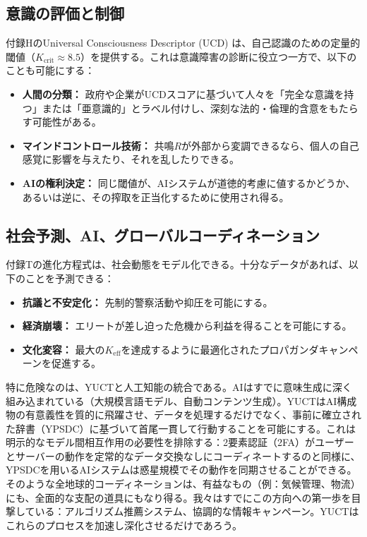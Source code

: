 \documentclass[12pt,a4paper]{article}
\theoremstyle{remark}
\newcommand{\Keff}{K_{\mathrm{eff}}}
\newcommand{\Kcrit}{K_{\mathrm{crit}}}
\begin{document}
	\subsection{意識の評価と制御}
	\label{subsec:consciousness}
	
	付録HのUniversal Consciousness Descriptor (UCD) は、自己認識のための定量的閾値（\(\Kcrit \approx 8.5\)）を提供する。これは意識障害の診断に役立つ一方で、以下のことも可能にする：
	\begin{itemize}[leftmargin=*]
		\item \textbf{人間の分類：} 政府や企業がUCDスコアに基づいて人々を「完全な意識を持つ」または「亜意識的」とラベル付けし、深刻な法的・倫理的含意をもたらす可能性がある。
		\item \textbf{マインドコントロール技術：} 共鳴\(R\)が外部から変調できるなら、個人の自己感覚に影響を与えたり、それを乱したりできる。
		\item \textbf{AIの権利決定：} 同じ閾値が、AIシステムが道徳的考慮に値するかどうか、あるいは逆に、その搾取を正当化するために使用され得る。
	\end{itemize}
	
	\subsection{社会予測、AI、グローバルコーディネーション}
	\label{subsec:social}
	
	付録Tの進化方程式は、社会動態をモデル化できる。十分なデータがあれば、以下のことを予測できる：
	\begin{itemize}[leftmargin=*]
		\item \textbf{抗議と不安定化：} 先制的警察活動や抑圧を可能にする。
		\item \textbf{経済崩壊：} エリートが差し迫った危機から利益を得ることを可能にする。
		\item \textbf{文化変容：} 最大の\(\Keff\)を達成するように最適化されたプロパガンダキャンペーンを促進する。
	\end{itemize}
	
	特に危険なのは、YUCTと人工知能の統合である。AIはすでに意味生成に深く組み込まれている（大規模言語モデル、自動コンテンツ生成）。YUCTはAI構成物の有意義性を質的に飛躍させ、データを処理するだけでなく、事前に確立された辞書（YPSDC）に基づいて首尾一貫して行動することを可能にする。これは明示的なモデル間相互作用の必要性を排除する：2要素認証（2FA）がユーザーとサーバーの動作を定常的なデータ交換なしにコーディネートするのと同様に、YPSDCを用いるAIシステムは惑星規模でその動作を同期させることができる。そのような全地球的コーディネーションは、有益なもの（例：気候管理、物流）にも、全面的な支配の道具にもなり得る。我々はすでにこの方向への第一歩を目撃している：アルゴリズム推薦システム、協調的な情報キャンペーン。YUCTはこれらのプロセスを加速し深化させるだけであろう。
	
\end{document}
